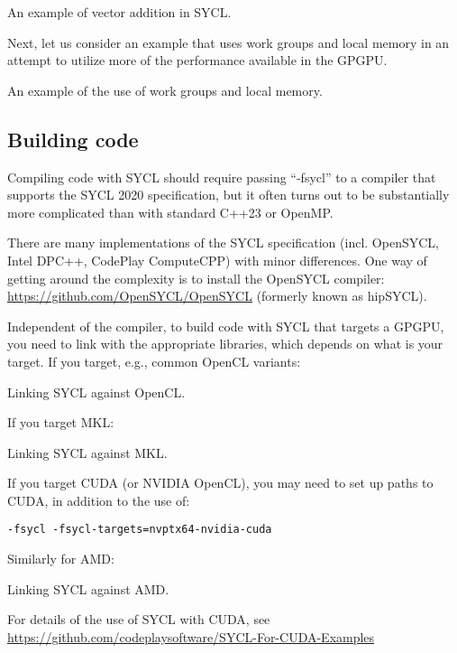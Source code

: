 \raggedbottom
\begin{codebox}[]{\href{https://godbolt.org/z/cPqE9PM6T}{\ExternalLink}}
\footnotesize An example of vector addition in SYCL.
\tcblower
{}
\end{codebox}

Next, let us consider an example that uses work groups and local memory in an attempt to utilize more of the performance available in the GPGPU. 

\raggedbottom
\begin{codebox}[]{\href{https://godbolt.org/z/4cvGY1sE9}{\ExternalLink}}
\footnotesize An example of the use of work groups and local memory.
\tcblower
{}
\end{codebox}
         
\subsection{Building code}

Compiling code with SYCL should require passing ``-fsycl'' to a compiler that supports the SYCL 2020 specification, 
but it often turns out to be substantially more complicated than with standard C++23 or OpenMP.

There are many implementations of the SYCL specification (incl. OpenSYCL, Intel DPC++, CodePlay ComputeCPP)
with minor differences. 
One way of getting around the complexity is to install the OpenSYCL compiler:
\url{https://github.com/OpenSYCL/OpenSYCL} (formerly known as hipSYCL).  

Independent of the compiler, to build code with SYCL that targets a GPGPU, you need to link with the appropriate libraries, which depends on what is your target. 
If you target, e.g., common OpenCL variants: 


\raggedbottom
\begin{codebox}[]{}
\footnotesize Linking SYCL against OpenCL.
\tcblower
{}
\end{codebox}

If you target MKL:

\raggedbottom
\begin{codebox}[]{}
\footnotesize Linking SYCL against MKL.
\tcblower
{}
\end{codebox}

If you target CUDA (or NVIDIA OpenCL), you may need to set up paths to CUDA, in addition to the use of:

\begin{verbatim}
-fsycl -fsycl-targets=nvptx64-nvidia-cuda
\end{verbatim}

Similarly for AMD:

\raggedbottom
\begin{codebox}[]{}
\footnotesize Linking SYCL against AMD.
\tcblower
{}
\end{codebox}

For details of the use of SYCL with CUDA, see \url{https://github.com/codeplaysoftware/SYCL-For-CUDA-Examples}
